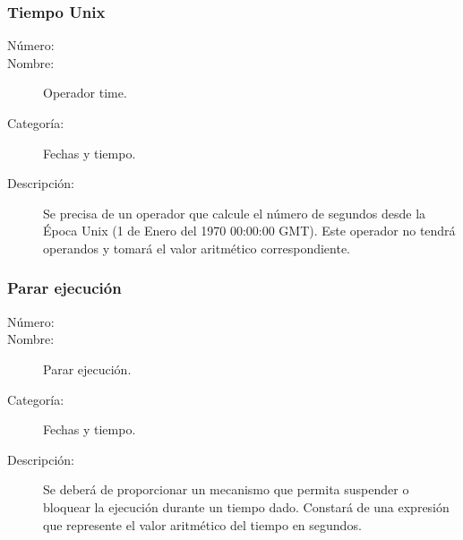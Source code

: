 \subsubsection{Tiempo Unix }
\begin{framed}
	\begin{description}
		\item [Número:] \cn
		\item [Nombre:] Operador time.
		\item [Categoría:] Fechas y tiempo.
		\item [Descripción:] Se precisa de un operador que calcule el número de segundos desde 
		la Época Unix (1 de Enero del 1970 00:00:00 GMT). Este operador no tendrá operandos y 
		tomará el valor aritmético correspondiente.		
	\end {description}
\end{framed}

\subsubsection{Parar ejecución}
\begin{framed}
	\begin{description}
		\item [Número:] \cn
		\item [Nombre:] Parar ejecución.
		\item [Categoría:] Fechas y tiempo.
		\item [Descripción:] Se deberá de proporcionar un mecanismo que permita suspender o bloquear
		la ejecución durante un tiempo dado. Constará de una expresión que
		represente el valor aritmético del tiempo en segundos.
	\end{description}
\end{framed}
